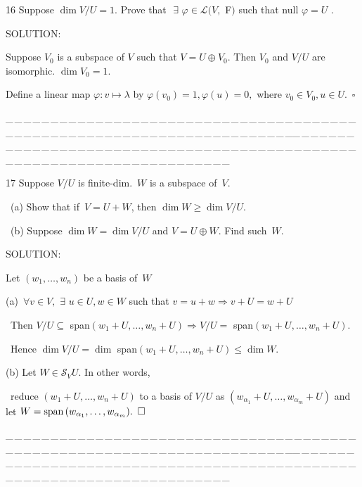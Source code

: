 \documentclass[a4paper, 11pt, UTF8]{article}
\def\Spn{\textup{span}\,}
\def\Lm{\mathcal{L}}
\begin{document}
\begin{large}
{\timesbf\Large 16} {\timessl\Large 
Suppose $\dim V/U=1$. Prove that $\,\,\exists\,\,\varphi\in\Lm(V,$ {\timesbf F}$)$ such that null $\varphi=U$
.}\par
{\timesbf S\footnotesize{OLUTION:}}\par\quad
Suppose $V_0$ is a subspace of $V$ such that $V=U\oplus V_0.$ Then $V_0$ and $V/U$ are isomorphic. $\dim V_0=1.$\par\quad
Define a linear map $\varphi:v\mapsto\lambda$ by $\varphi(v_0)=1,\varphi(u)=0,$ where $v_0\in V_0,u\in U.\,\,\,\square$\par
{\tiny \_\,\_\,\_\,\_\,\_\,\_\,\_\,\_\,\_\,\_\,\_\,\_\,\_\,\_\,\_\,\_\,\_\,\_\,\_\,\_\,\_\,\_\,\_\,\_\,\_\,\_\,\_\,\_\,\_\,\_\,\_\,\_\,\_\,\_\,\_\,\_\,\_\,\_\,\_\,\_\,\_\,\_\,\_\,\_\,\_\,\_\,\_\,\_\,\_\,\_\,\_\,\_\,\_\,\_\,\_\,\_\,\_\,\_\,\_\,\_\,\_\,\_\,\_\,\_\,\_\,\_\,\_\,\_\,\_\,\_\,\_\_\,\_\,\_\,\_\,\_\,\_\,\_\,\_\,\_\,\_\,\_\,\_\,\_\,\_\,\_\,\_\,\_\,\_\,\_\,\_\,\_\,\_\,\_\,\_\,\_\,\_\,\_\,\_\,\_\,\_\,\_\,\_\,\_\,\_\,\_\,\_\,\_\,\_\,\_\,\_\,\_\,\_\,\_\,\_\,\_\,\_\,\_\,\_\,\_\,\_\,\_\,\_\,\_\,\_\,\_\,\_\,\_\,\_\,\_\,\_\,\_\,\_\,\_\,\_\,\_\,\_\,\_\,\_\,\_\,\_\,\_}\par

{\timesbf\Large 17} {\timessl\Large 
Suppose $V/U$ is finite-dim. \,$W$ is a subspace of \,$V$.}\par\quad\,
(a) {\timessl\Large Show that if \,$V=U+W$, then $\dim W\geq\dim V/U$.}\par\quad\,
(b) {\timessl\Large Suppose $\dim W=\dim V/U$ and $V=U\oplus W$. Find such \,$W$.}\par
{\timesbf S\footnotesize{OLUTION:}}\par\quad
Let $(w_1,\dots,w_n)$ be a basis of \,$W$\par\quad
(a) \,$\forall v\in V,\,\,\exists\,\,u\in U,w\in W$ such that $v=u+w\Rightarrow v+U=w+U$\par\qquad\,
Then $V/U\subseteq$ span$(w_1+U,\dots,w_n+U)\Rightarrow V/U=$ span$(w_1+U,\dots,w_n+U)$.\par\qquad\,
Hence $\dim V/U=\dim$ span$(w_1+U,\dots,w_n+U)\leq\dim W.$\par\quad
(b) Let $W\in\mathcal{S}_V U.$ In other words,\par\qquad\,
reduce $(w_1+U,\dots,w_n+U)$ to a basis of $V/U$ as $(w_{\alpha_1}+U,\dots,w_{\alpha_m}+U)$ and let $W=\Spn(w_{\alpha_1},\dots,w_{\alpha_m}).\,\,\,\square$\par
{\tiny \_\,\_\,\_\,\_\,\_\,\_\,\_\,\_\,\_\,\_\,\_\,\_\,\_\,\_\,\_\,\_\,\_\,\_\,\_\,\_\,\_\,\_\,\_\,\_\,\_\,\_\,\_\,\_\,\_\,\_\,\_\,\_\,\_\,\_\,\_\,\_\,\_\,\_\,\_\,\_\,\_\,\_\,\_\,\_\,\_\,\_\,\_\,\_\,\_\,\_\,\_\,\_\,\_\,\_\,\_\,\_\,\_\,\_\,\_\,\_\,\_\,\_\,\_\,\_\,\_\,\_\,\_\,\_\,\_\,\_\,\_\_\,\_\,\_\,\_\,\_\,\_\,\_\,\_\,\_\,\_\,\_\,\_\,\_\,\_\,\_\,\_\,\_\,\_\,\_\,\_\,\_\,\_\,\_\,\_\,\_\,\_\,\_\,\_\,\_\,\_\,\_\,\_\,\_\,\_\,\_\,\_\,\_\,\_\,\_\,\_\,\_\,\_\,\_\,\_\,\_\,\_\,\_\,\_\,\_\,\_\,\_\,\_\,\_\,\_\,\_\,\_\,\_\,\_\,\_\,\_\,\_\,\_\,\_\,\_\,\_\,\_\,\_\,\_\,\_\,\_\,\_}\par


\end{large}
\end{document}
